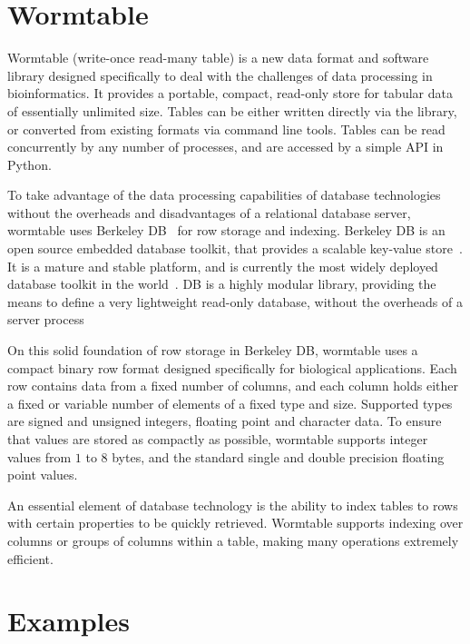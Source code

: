 \documentclass{bioinfo}
\begin{document}
\section{Wormtable}
Wormtable (write-once read-many table) 
is a new data format and software library designed specifically
to deal with the challenges of data processing in bioinformatics.
It provides a portable, compact, read-only store for tabular
data of essentially unlimited size. Tables can
be either written directly via the library, or converted
from existing formats via command line tools. Tables can be read 
concurrently by any number of processes, and are accessed by a 
simple API in Python.

To take advantage of the data processing capabilities of database
technologies without the overheads and disadvantages of a relational database 
server, wormtable uses Berkeley DB~\citep{obs99} for row storage and indexing.
Berkeley DB is an open source embedded database toolkit, that provides a
scalable key-value store~\citep{m12}. It is a mature and stable platform, 
and is currently the most widely deployed database toolkit in the 
world~\citep{sb12}. DB is a highly modular library, providing the 
means to define a very lightweight read-only database, without the 
overheads of a server process

On this solid foundation of row storage in Berkeley DB, wormtable uses a
compact binary row format designed specifically for biological applications.
Each row contains data from a fixed number of columns, and each column 
holds either a fixed or variable number of elements of a fixed type and size.
Supported types are signed and unsigned integers, 
floating point and character data. To ensure that values are 
stored as compactly as possible, wormtable supports integer values from 
$1$ to $8$ bytes, and the standard single and double precision 
floating point values. 

An essential element of database technology is the ability to index tables
to rows with certain properties to be quickly retrieved. Wormtable 
supports indexing over columns or groups of columns within a table, 
making many operations extremely efficient. 

\section{Examples}
\end{document}
